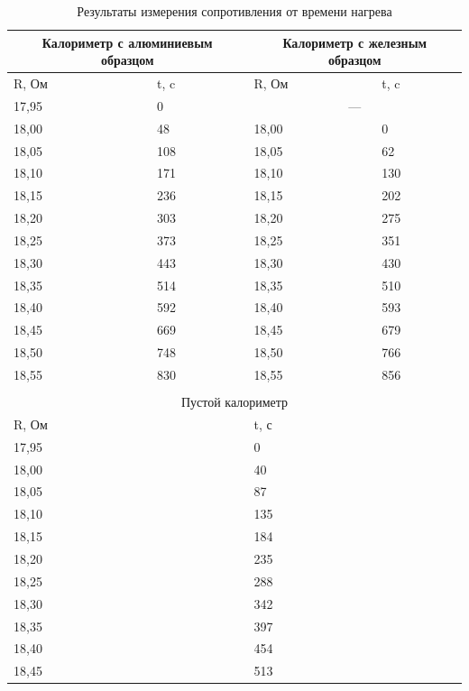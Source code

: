 \documentclass[a4paper,12pt]{article} %
\begin{document}
\begin{table}[h]
    \begin{tabular}{|p{3cm}|p{3cm}|p{3cm}|p{3cm}|}
    \hline

\multicolumn{2}{|c|}{Калориметр с алюминиевым образцом} & \multicolumn{2}{|c|}{Калориметр с железным образцом}\\ \hline
R, Ом & t, c & R, Ом & t, c \\ \hline
17,95 & 0 & \multicolumn{2}{|c|}{---} \\ \hline
18,00 & 48 & 18,00 & 0 \\ \hline
18,05 & 108 & 18,05 & 62 \\ \hline
18,10 & 171 & 18,10 & 130 \\ \hline
18,15 & 236 & 18,15 & 202 \\ \hline
18,20 & 303 & 18,20 & 275 \\ \hline
18,25 & 373 & 18,25 & 351 \\ \hline
18,30 & 443 & 18,30 & 430 \\ \hline
18,35 & 514 & 18,35 & 510 \\ \hline
18,40 & 592 & 18,40 & 593 \\ \hline
18,45 & 669 & 18,45 & 679 \\ \hline
18,50 & 748 & 18,50 & 766 \\ \hline
18,55 & 830 & 18,55 & 856 \\ \hline

\multicolumn{4}{c}{} \\ \hline

\multicolumn{4}{|c|}{Пустой калориметр}\\ \hline
\multicolumn{2}{|l|}{R, Ом} & \multicolumn{2}{|l|}{t, с}  \\ \hline 
\multicolumn{2}{|l|}{17,95} & \multicolumn{2}{|l|}{0}  \\ \hline     
\multicolumn{2}{|l|}{18,00} & \multicolumn{2}{|l|}{40}  \\ \hline     
\multicolumn{2}{|l|}{18,05} & \multicolumn{2}{|l|}{87}  \\ \hline     
\multicolumn{2}{|l|}{18,10} & \multicolumn{2}{|l|}{135}  \\ \hline     
\multicolumn{2}{|l|}{18,15} & \multicolumn{2}{|l|}{184}  \\ \hline     
\multicolumn{2}{|l|}{18,20} & \multicolumn{2}{|l|}{235}  \\ \hline     
\multicolumn{2}{|l|}{18,25} & \multicolumn{2}{|l|}{288}  \\ \hline     
\multicolumn{2}{|l|}{18,30} & \multicolumn{2}{|l|}{342}  \\ \hline     
\multicolumn{2}{|l|}{18,35} & \multicolumn{2}{|l|}{397}  \\ \hline     
\multicolumn{2}{|l|}{18,40} & \multicolumn{2}{|l|}{454}  \\ \hline     
\multicolumn{2}{|l|}{18,45} & \multicolumn{2}{|l|}{513}  \\ \hline 

    \end{tabular}
    \caption {Результаты измерения сопротивления от времени нагрева}
    \label{results_of_measuring_}
\end{table}
\end{document}
